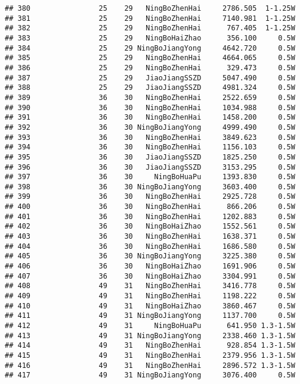 \documentclass[]{article}
\begin{document}
\begin{verbatim}
## 380                25    29   NingBoZhenHai     2786.505  1-1.25W
## 381                25    29   NingBoZhenHai     7140.981  1-1.25W
## 382                25    29   NingBoZhenHai      767.405  1-1.25W
## 383                25    29   NingBoHaiZhao      356.100     0.5W
## 384                25    29 NingBoJiangYong     4642.720     0.5W
## 385                25    29   NingBoZhenHai     4664.065     0.5W
## 386                25    29   NingBoZhenHai      329.473     0.5W
## 387                25    29   JiaoJiangSSZD     5047.490     0.5W
## 388                25    29   JiaoJiangSSZD     4981.324     0.5W
## 389                36    30   NingBoZhenHai     2522.659     0.5W
## 390                36    30   NingBoZhenHai     1034.988     0.5W
## 391                36    30   NingBoZhenHai     1458.200     0.5W
## 392                36    30 NingBoJiangYong     4999.490     0.5W
## 393                36    30   NingBoZhenHai     3849.623     0.5W
## 394                36    30   NingBoZhenHai     1156.103     0.5W
## 395                36    30   JiaoJiangSSZD     1825.250     0.5W
## 396                36    30   JiaoJiangSSZD     3153.295     0.5W
## 397                36    30     NingBoHuaPu     1393.830     0.5W
## 398                36    30 NingBoJiangYong     3603.400     0.5W
## 399                36    30   NingBoZhenHai     2925.728     0.5W
## 400                36    30   NingBoZhenHai      866.206     0.5W
## 401                36    30   NingBoZhenHai     1202.883     0.5W
## 402                36    30   NingBoHaiZhao     1552.561     0.5W
## 403                36    30   NingBoZhenHai     1638.371     0.5W
## 404                36    30   NingBoZhenHai     1686.580     0.5W
## 405                36    30 NingBoJiangYong     3225.380     0.5W
## 406                36    30   NingBoHaiZhao     1691.906     0.5W
## 407                36    30   NingBoHaiZhao     3304.991     0.5W
## 408                49    31   NingBoZhenHai     3416.778     0.5W
## 409                49    31   NingBoZhenHai     1198.222     0.5W
## 410                49    31   NingBoHaiZhao     3860.467     0.5W
## 411                49    31 NingBoJiangYong     1137.700     0.5W
## 412                49    31     NingBoHuaPu      641.950 1.3-1.5W
## 413                49    31 NingBoJiangYong     2338.460 1.3-1.5W
## 414                49    31   NingBoZhenHai      928.854 1.3-1.5W
## 415                49    31   NingBoZhenHai     2379.956 1.3-1.5W
## 416                49    31   NingBoZhenHai     2896.572 1.3-1.5W
## 417                49    31 NingBoJiangYong     3076.400     0.5W

\end{verbatim}
\end{document}
